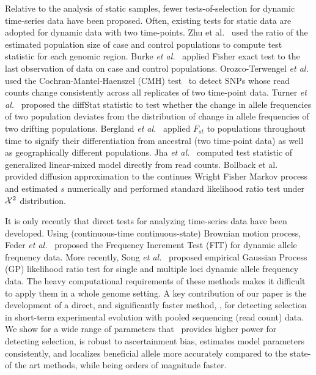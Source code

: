 \documentclass[11pt]{article}
\def\comale{\text{{\sc Comale}}}
\begin{document}
Relative to the analysis of static samples, fewer tests-of-selection
for dynamic time-series data have been proposed. Often, existing tests
for static data are adopted for dynamic data with two time-points. Zhu
et al.~\cite{zhou2011experimental} used the ratio of the estimated
population size of case and control populations to compute test
statistic for each genomic region. Burke \emph{et
  al.}~\cite{burke2010genome} applied Fisher exact test to the last
observation of data on case and control populations.  Orozco-Terwengel
\emph{et al.}~\cite{orozco2012adaptation} used the
Cochran-Mantel-Haenszel (CMH) test~\cite{agresti2011categorical} to
detect SNPs whose read counts change consistently across all
replicates of two time-point data.  Turner \emph{et
  al.}~\cite{turner2011population} proposed the diffStat statistic to
test whether the change in allele frequencies of two population
deviates from the distribution of change in allele frequencies of two
drifting populations.  Bergland \emph{et
  al.}~\cite{bergland2014genomic} applied $F_{st}$ to populations
throughout time to signify their differentiation from ancestral (two
time-point data) as well as geographically different populations. Jha
\emph{et al.}~\cite{jha2015whole} computed test statistic of
generalized linear-mixed model directly from read counts.  Bollback et
al.~\cite{bollback2008estimation} provided diffusion approximation to
the continues Wright Fisher Markov process and estimated $s$
numerically and performed standard likelihood ratio test under ${\cal X}^2$
distribution.

It is only recently that direct tests for analyzing time-series data
have been developed. Using (continuous-time continuous-state) Brownian
motion process, Feder \emph{et al.}~\cite{feder2014Identifying}
proposed the Frequency Increment Test (FIT) for dynamic allele
frequency data. More recently, Song \emph{et
  al.}~\cite{Terhorst2015Multi} proposed empirical Gaussian Process
(GP) likelihood ratio test for single and multiple loci dynamic allele
frequency data. The heavy computational requirements of these methods
makes it difficult to apply them in a whole genome setting.  A key
contribution of our paper is the development of a direct, and
significantly faster method, \comale, for detecting selection in
short-term experimental evolution with pooled sequencing (read count)
data.  We show for a wide range of parameters that \comale\ provides
higher power for detecting selection, is robust to ascertainment bias,
estimates model parameters consistently, and localizes beneficial
allele more accurately compared to the state-of the art methods, while
being orders of magnitude faster.
\end{document}
